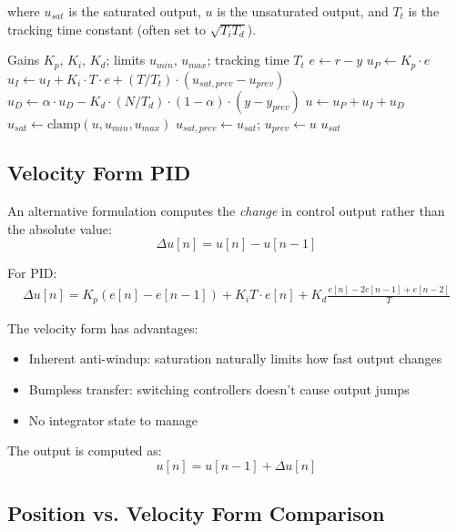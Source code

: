 where $u_{sat}$ is the saturated output, $u$ is the unsaturated output, and $T_t$ is the tracking time constant (often set to $\sqrt{T_i T_d}$).

\begin{algorithm}[htbp]
\caption{Digital PID with Anti-Windup (Back-Calculation)}
\label{alg:pid_antiwindup}
\begin{algorithmic}[1]
\REQUIRE Gains $K_p$, $K_i$, $K_d$; limits $u_{min}$, $u_{max}$; tracking time $T_t$
\STATE $e \gets r - y$
\STATE $u_P \gets K_p \cdot e$
\STATE $u_I \gets u_I + K_i \cdot T \cdot e + (T/T_t) \cdot (u_{sat,prev} - u_{prev})$
\STATE $u_D \gets \alpha \cdot u_D - K_d \cdot (N/T_d) \cdot (1-\alpha) \cdot (y - y_{prev})$
\STATE $u \gets u_P + u_I + u_D$
\STATE $u_{sat} \gets \text{clamp}(u, u_{min}, u_{max})$ 
\STATE $u_{sat,prev} \gets u_{sat}$; $u_{prev} \gets u$
\RETURN $u_{sat}$
\end{algorithmic}
\end{algorithm}

\subsection{Velocity Form PID}

An alternative formulation computes the \textit{change} in control output rather than the absolute value:
\begin{equation}
\Delta u[n] = u[n] - u[n-1]
\end{equation}

For PID:
\begin{align}
\Delta u[n] = K_p (e[n] - e[n-1]) + K_i T \cdot e[n] + K_d \frac{e[n] - 2e[n-1] + e[n-2]}{T}
\end{align}

The velocity form has advantages:
\begin{itemize}
    \item Inherent anti-windup: saturation naturally limits how fast output changes
    \item Bumpless transfer: switching controllers doesn't cause output jumps
    \item No integrator state to manage
\end{itemize}

The output is computed as:
\begin{equation}
u[n] = u[n-1] + \Delta u[n]
\end{equation}

\subsection{Position vs. Velocity Form Comparison}

